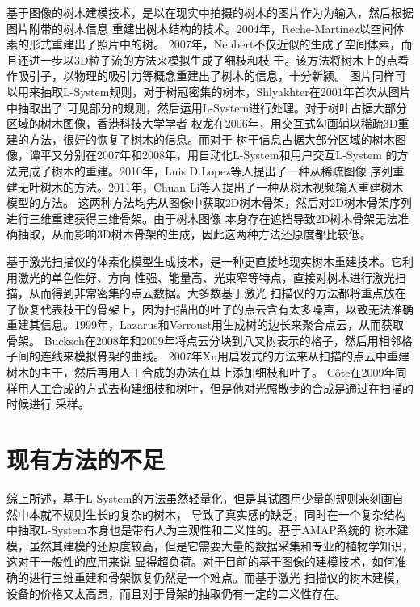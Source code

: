 基于图像的树木建模技术，是以在现实中拍摄的树木的图片作为为输入，然后根据图片附带的树木信息
重建出树木结构的技术。2004年，Reche-Martinez以空间体素的形式重建出了照片中的树\cite{reche}。
2007年，Neubert不仅近似的生成了空间体素，而且还进一步以3D粒子流的方法来模拟生成了细枝和枝
干\cite{neubert}。该方法将树木上的点看作吸引子，以物理的吸引力等概念重建出了树木的信息，十分新颖。
图片同样可以用来抽取L-System规则，对于树冠密集的树木，Shlyakhter在2001年首次从图片中抽取出了
可见部分的规则，然后运用L-System进行处理。对于树叶占据大部分区域的树木图像，香港科技大学学者
权龙在2006年，用交互式勾画辅以稀疏3D重建的方法，很好的恢复了树木的信息\cite{quanlong}。而对于
树干信息占据大部分区域的树木图像，谭平又分别在2007年和2008年，用自动化L-System和用户交互L-System
的方法完成了树木的重建\cite{tanping,tanping2}。2010年，Luis D.Lopez等人提出了一种从稀疏图像
序列重建无叶树木的方法。2011年，Chuan Li等人提出了一种从树木视频输入重建树木模型的方法\cite{lichuan}。
这两种方法均先从图像中获取2D树木骨架，然后对2D树木骨架序列进行三维重建获得三维骨架。由于树木图像
本身存在遮挡导致2D树木骨架无法准确抽取，从而影响3D树木骨架的生成，因此这两种方法还原度都比较低。

基于激光扫描仪的体素化模型生成技术，是一种更直接地现实树木重建技术。它利用激光的单色性好、方向
性强、能量高、光束窄等特点，直接对树木进行激光扫描，从而得到非常密集的点云数据。大多数基于激光
扫描仪的方法都将重点放在了恢复代表枝干的骨架上，因为扫描出的叶子的点云含有太多噪声，以致无法准确
重建其信息。1999年，Lazarus和Verroust用生成树的边长来聚合点云，从而获取骨架\cite{verroust}。
Bucksch在2008年和2009年将点云分块到八叉树表示的格子，然后用相邻格子间的连线来模拟骨架的曲线\cite{bucksch}。
2007年Xu用启发式的方法来从扫描的点云中重建树木的主干，然后再用人工合成的办法在其上添加细枝和叶子\cite{xu}。
C\^ote在2009年同样用人工合成的方式去构建细枝和树叶，但是他对光照散步的合成是通过在扫描的时候进行
采样\cite{cote}。

\section{现有方法的不足}

综上所述，基于L-System的方法虽然轻量化，但是其试图用少量的规则来刻画自然中本就不规则生长的复杂的树木，
导致了真实感的缺乏，同时在一个复杂结构中抽取L-System本身也是带有人为主观性和二义性的。基于AMAP系统的
树木建模，虽然其建模的还原度较高，但是它需要大量的数据采集和专业的植物学知识，这对于一般性的应用来说
显得超负荷。对于目前的基于图像的建模技术，如何准确的进行三维重建和骨架恢复仍然是一个难点。而基于激光
扫描仪的树木建模，设备的价格又太高昂，而且对于骨架的抽取仍有一定的二义性存在。

